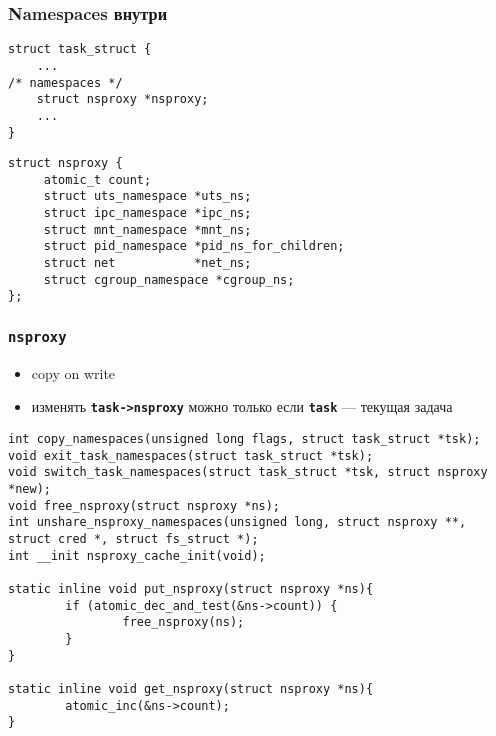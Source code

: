 \begin{frame}[fragile, label={ns_internals}]
\frametitle{Namespaces внутри}
\begin{lstlisting}[title={\href{http://lxr.free-electrons.com/source/include/linux/sched.h\#L1658}{sched.h}}]
struct task_struct {
    ...
/* namespaces */
    struct nsproxy *nsproxy;
    ...
}
\end{lstlisting}
\begin{lstlisting}[title={\href{http://lxr.free-electrons.com/source/include/linux/nsproxy.h\#L30}{nsproxy.h}}]
struct nsproxy {
     atomic_t count;
     struct uts_namespace *uts_ns;
     struct ipc_namespace *ipc_ns;
     struct mnt_namespace *mnt_ns;
     struct pid_namespace *pid_ns_for_children;
     struct net           *net_ns;
     struct cgroup_namespace *cgroup_ns;
};
\end{lstlisting}
\end{frame}

\begin{frame}[fragile]
\frametitle{\texttt{nsproxy}}
\begin{small}
\begin{itemize}
	\item copy on write
	\item \alert{изменять} \textbf{\texttt{task->nsproxy}} можно только если \textbf{\texttt{task}} --- текущая задача
\end{itemize}
\end{small}
\begin{lstlisting}[basicstyle={\tiny\ttfamily}, title=\href{http://lxr.free-electrons.com/source/include/linux/nsproxy.h\#L67}{nsproxy methods}]
int copy_namespaces(unsigned long flags, struct task_struct *tsk);
void exit_task_namespaces(struct task_struct *tsk);
void switch_task_namespaces(struct task_struct *tsk, struct nsproxy *new);
void free_nsproxy(struct nsproxy *ns);
int unshare_nsproxy_namespaces(unsigned long, struct nsproxy **, struct cred *, struct fs_struct *);
int __init nsproxy_cache_init(void);

static inline void put_nsproxy(struct nsproxy *ns){
        if (atomic_dec_and_test(&ns->count)) {
                free_nsproxy(ns);
        }
}

static inline void get_nsproxy(struct nsproxy *ns){
        atomic_inc(&ns->count);
}
\end{lstlisting}
\end{frame}

